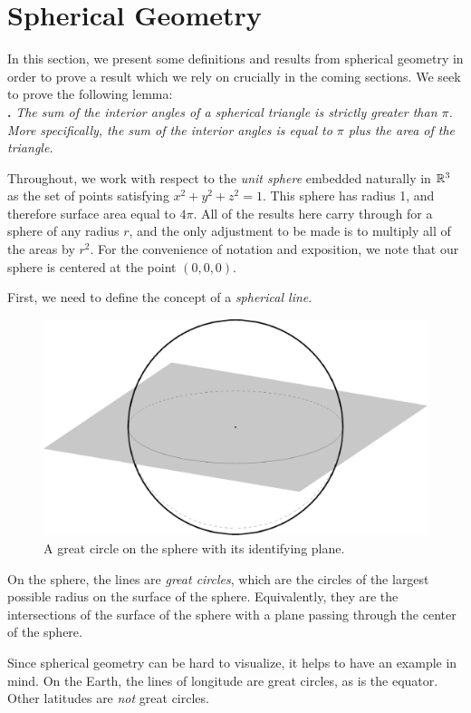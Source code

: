 \section{Spherical Geometry}
In this section, we present some definitions and results from spherical geometry in order to prove a result which we rely on crucially in the coming sections.  We seek to prove the following lemma:\\

\noindent\textbf{.}
\emph{The sum of the interior angles of a spherical triangle is strictly greater than $\pi$.  More specifically, the sum of the interior angles is equal to $\pi$ plus the area of the triangle.}


Throughout, we work with respect to the \textit{unit sphere} embedded naturally in $\mathbb{R}^3$ as the set of points satisfying $x^2+y^2+z^2=1$.  This sphere has radius 1, and therefore surface area equal to $4\pi$.  All of the results here carry through for a sphere of any radius $r$, and the only adjustment to be made is to multiply all of the areas by $r^2$.  For the convenience of notation and exposition, we note that our sphere is centered at the point $(0,0,0)$.

First, we need to define the concept of a \textit{spherical line}.  


\begin{figure}[htb]
	\centering
	\includegraphics[width=.5\textwidth]{figs/sph-1pl.pdf}
	\caption{A great circle on the sphere with its identifying plane.}
	\label{fig:sphereline}
\end{figure}


\begin{definition}
On the sphere, the lines are \textit{great circles}, which are the circles of the largest possible radius on the surface of the sphere.  Equivalently, they are the intersections of the surface of the sphere with a plane passing through the center of the sphere.
\end{definition}  


Since spherical geometry can be hard to visualize, it helps to have an example in mind.  On the Earth, the lines of longitude are great circles, as is the equator.  Other latitudes are \textit{not} great circles.






